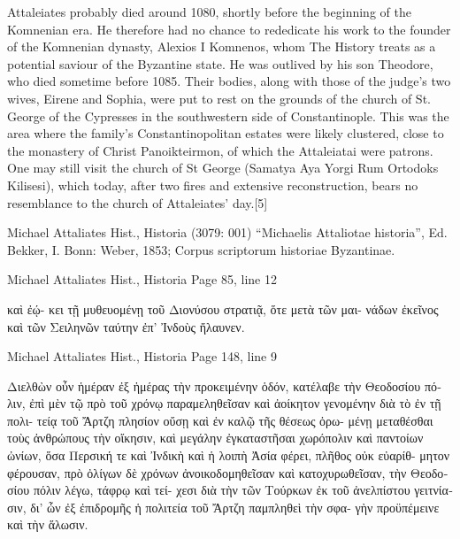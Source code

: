 \documentclass[12pt,letterpaper,twoside,final]{memoir}
\begin{document}
{Attaleiates probably died around 1080, shortly before the beginning of the Komnenian era. He therefore had no chance to rededicate his work to the founder of the Komnenian dynasty, Alexios I Komnenos, whom The History treats as a potential saviour of the Byzantine state. He was outlived by his son Theodore, who died sometime before 1085. Their bodies, along with those of the judge's two wives, Eirene and Sophia, were put to rest on the grounds of the church of St. George of the Cypresses in the southwestern side of Constantinople. This was the area where the family's Constantinopolitan estates were likely clustered, close to the monastery of Christ Panoikteirmon, of which the Attaleiatai were patrons. One may still visit the church of St George (Samatya Aya Yorgi Rum Ortodoks Kilisesi), which today, after two fires and extensive reconstruction, bears no resemblance to the church of Attaleiates' day.[5]}

\begin{greek}

Michael Attaliates Hist., Historia (3079: 001)
“Michaelis Attaliotae historia”, Ed. Bekker, I.
Bonn: Weber, 1853; Corpus scriptorum historiae Byzantinae.

Michael Attaliates Hist., Historia 
Page 85, line 12

                                                          καὶ ἐῴ-
κει τῇ μυθευομένῃ τοῦ Διονύσου στρατιᾷ, ὅτε μετὰ τῶν μαι-
νάδων ἐκεῖνος καὶ τῶν Σειληνῶν ταύτην ἐπ' Ἰνδοὺς ἤλαυνεν. 



Michael Attaliates Hist., Historia 
Page 148, line 9

Διελθὼν οὖν ἡμέραν ἐξ ἡμέρας τὴν προκειμένην ὁδόν, 
κατέλαβε τὴν Θεοδοσίου πόλιν, ἐπὶ μὲν τῷ πρὸ τοῦ χρόνῳ 
παραμεληθεῖσαν καὶ ἀοίκητον γενομένην διὰ τὸ ἐν τῇ πολι-
τείᾳ τοῦ Ἄρτζη πλησίον οὔσῃ καὶ ἐν καλῷ τῆς θέσεως ὁρω-
μένῃ μεταθέσθαι τοὺς ἀνθρώπους τὴν οἴκησιν, καὶ μεγάλην 
ἐγκαταστῆσαι χωρόπολιν καὶ παντοίων ὠνίων, ὅσα Περσική 
τε καὶ Ἰνδικὴ καὶ ἡ λοιπὴ Ἀσία φέρει, πλῆθος οὐκ εὐαρίθ-
μητον φέρουσαν, πρὸ ὀλίγων δὲ χρόνων ἀνοικοδομηθεῖσαν καὶ 
κατοχυρωθεῖσαν, τὴν Θεοδοσίου πόλιν λέγω, τάφρῳ καὶ τεί-
χεσι διὰ τὴν τῶν Τούρκων ἐκ τοῦ ἀνελπίστου γειτνίασιν, δι' 
ὧν ἐξ ἐπιδρομῆς ἡ πολιτεία τοῦ Ἄρτζη παμπληθεὶ τὴν σφα-
γὴν προϋπέμεινε καὶ τὴν ἅλωσιν. 

\end{greek}
\end{document}
